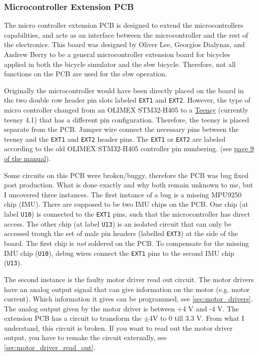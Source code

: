 \subsubsection{Microcontroller Extension PCB} \label{sec:micro_extension_board}
The micro controller extension PCB is designed to extend the microcontrollers capabilities, and acts as an interface between the microcontroller and the rest of the electronics.
This board was designed by Oliver Lee, Georgios Dialynas, and Andrew Berry to be a general microcontroller extension board for bicycles applied in both the bicycle simulator and the sbw bicycle. Therefore, not all functions on the PCB are used for the sbw operation.

Originally the microcontroller would have been directly placed on the board in the two double row header pin slots labeled \texttt{EXT1} and \texttt{EXT2}.
However, the type of micro controller changed from an OLIMEX STM32-H405 to a \href{https://www.pjrc.com/teensy/}{Teensy} (currently teensy 4.1) that has a different pin configuration.
Therefore, the teensy is placed separate from the PCB.
Jumper wire connect the necessary pins between the teensy and the \texttt{EXT1} and \texttt{EXT2} header pins.
The \texttt{EXT1} or \texttt{EXT2} are labeled according to the old OLIMEX STM32-H405 controller pin numbering. (see \href{https://www.olimex.com/Products/ARM/ST/STM32-H405/resources/STM32-H405_UM.pdf}{page 9 of the manual}).

Some circuits on this PCB were broken/buggy, therefore the PCB was bug fixed post production.
What is done exactly and why both remain unknown to me, but I uncovered three instances.
The first instance of a bug is a missing MPU9250 chip (IMU).
There are supposed to be two IMU chips on the PCB.
One chip (at label \texttt{U10}) is connected to the \texttt{EXT1} pins, such that the microcontroller has direct access.
The other chip (at label \texttt{U13}) is an isolated circuit that can only be accessed trough the set of male pin headers (labelled \texttt{EXT3}) at the side of the board.
The first chip is \textit{not} soldered on the PCB.
To compensate for the missing IMU chip (\texttt{U10}), debug wires connect the \texttt{EXT1} pins to the second IMU chip (\texttt{U13}).

The second instance is the faulty motor driver read out circuit.
The motor drivers have an analog output signal that can give information on the motor (e.g. motor current).
Which information it gives can be programmed, see \autoref{sec:motor_drivers}.
The analog output given by the motor driver is between +4 V and -4 V.
The extension PCB has a circuit to transform the $\pm$4V to 0 till 3.3 V.
From what I understand, this circuit is broken.
If you want to read out the motor driver output, you have to remake the circuit externally, see  \autoref{sec:motor_driver_read_out}.

